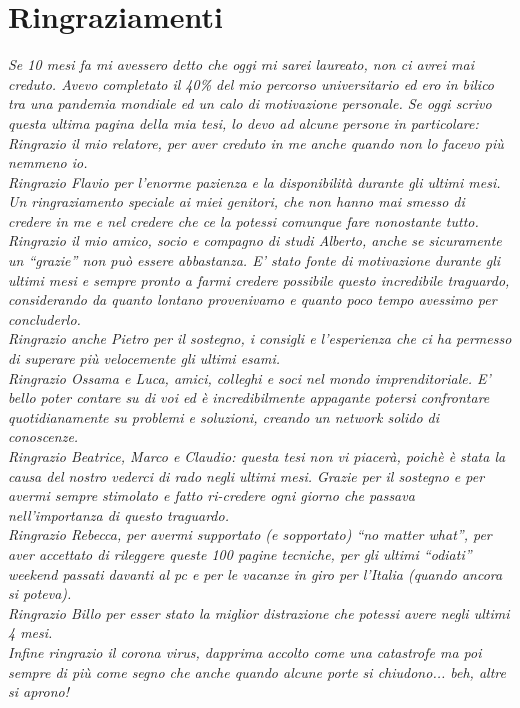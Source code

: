 \chapter*{Ringraziamenti}
\thispagestyle{empty}
\begin{flushright}
	\textit{Se 10 mesi fa mi avessero detto che oggi mi sarei laureato, non ci avrei mai creduto. Avevo completato il 40\% del mio percorso universitario ed ero in bilico tra una pandemia mondiale ed un calo di motivazione personale.
	Se oggi scrivo questa ultima pagina della mia tesi, lo devo ad alcune persone in particolare:\\	
		 Ringrazio il mio relatore, per aver creduto in me anche quando non lo facevo più nemmeno io.\\Ringrazio {\normalfont Flavio} per l'enorme pazienza e la disponibilità durante gli ultimi mesi.\\Un ringraziamento speciale ai miei genitori, che non hanno mai smesso di credere in me e nel credere che ce la potessi comunque fare nonostante tutto.\\
		 Ringrazio il mio amico, socio e compagno di studi {\normalfont Alberto}, anche se sicuramente un \enquote{grazie} non può essere abbastanza. E' stato fonte di motivazione durante gli ultimi mesi e sempre pronto a farmi credere possibile questo incredibile traguardo, considerando da quanto lontano provenivamo e quanto poco tempo avessimo per concluderlo.\\
		 Ringrazio anche {\normalfont Pietro} per il sostegno, i consigli e l'esperienza che ci ha permesso di superare più velocemente gli ultimi esami.\\
		Ringrazio {\normalfont Ossama} e {\normalfont Luca}, amici, colleghi e soci nel mondo imprenditoriale. E' bello poter contare su di voi ed è incredibilmente appagante potersi confrontare quotidianamente su problemi e soluzioni, creando un network solido di conoscenze.\\
		Ringrazio {\normalfont Beatrice}, {\normalfont Marco} e {\normalfont Claudio}: questa tesi non vi piacerà, poichè è stata la causa del nostro vederci di rado negli ultimi mesi. Grazie per il sostegno e per avermi sempre stimolato e fatto ri-credere ogni giorno che passava nell'importanza di questo traguardo.\\
		Ringrazio {\normalfont Rebecca}, per avermi supportato (e sopportato) \enquote{no matter what}, per aver accettato di rileggere queste 100 pagine tecniche, per gli ultimi \enquote{odiati} weekend passati davanti al pc e per le vacanze in giro per l'Italia (quando ancora si poteva).\\
		Ringrazio {\normalfont Billo} per esser stato la miglior distrazione che potessi avere negli ultimi 4 mesi.\\
		Infine ringrazio il corona virus, dapprima accolto come una catastrofe ma poi sempre di più come segno che anche quando alcune porte si chiudono... beh, altre si aprono!}
\end{flushright}
